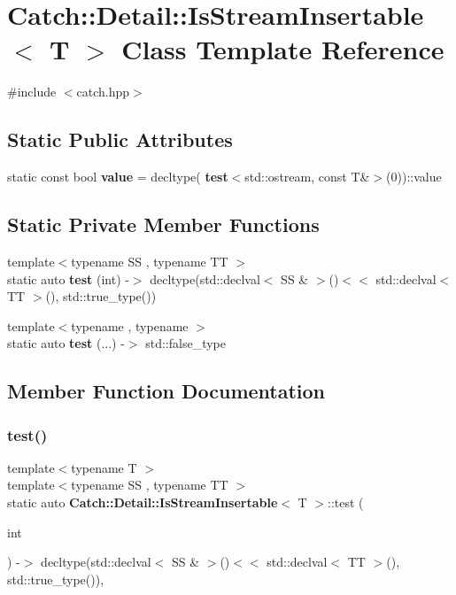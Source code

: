 \section{Catch\+::Detail\+::Is\+Stream\+Insertable$<$ T $>$ Class Template Reference}
\label{class_catch_1_1_detail_1_1_is_stream_insertable}


{\ttfamily \#include $<$catch.\+hpp$>$}

\subsection*{Static Public Attributes}
\begin{DoxyCompactItemize}
\item 
static const bool \textbf{ value} = decltype(\textbf{ test}$<$std\+::ostream, const T\&$>$(0))\+::value
\end{DoxyCompactItemize}
\subsection*{Static Private Member Functions}
\begin{DoxyCompactItemize}
\item 
{\footnotesize template$<$typename SS , typename TT $>$ }\\static auto \textbf{ test} (int) -\/$>$ decltype(std\+::declval$<$ SS \& $>$()$<$$<$ std\+::declval$<$ TT $>$(), std\+::true\+\_\+type())
\item 
{\footnotesize template$<$typename , typename $>$ }\\static auto \textbf{ test} (...) -\/$>$ std\+::false\+\_\+type
\end{DoxyCompactItemize}


\subsection{Member Function Documentation}
\mbox{\label{class_catch_1_1_detail_1_1_is_stream_insertable_ac5981238a76d66e36b3d014aa870d15c}} 
\subsubsection{test()\hspace{0.1cm}{\footnotesize\ttfamily [1/2]}}
{\footnotesize\ttfamily template$<$typename T $>$ \\
template$<$typename SS , typename TT $>$ \\
static auto \textbf{ Catch\+::\+Detail\+::\+Is\+Stream\+Insertable}$<$ T $>$\+::test (\begin{DoxyParamCaption}\item[{int}]{ }\end{DoxyParamCaption}) -\/$>$  decltype(std\+::declval$<$ SS \& $>$()$<$$<$ std\+::declval$<$ TT $>$(), std\+::true\+\_\+type())\hspace{0.3cm}{\ttfamily [static]}, {\ttfamily [private]}}

